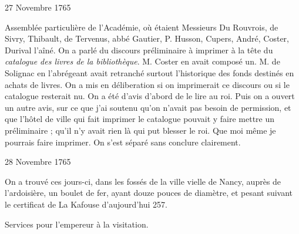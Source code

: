                      \begin{diary}{27 Novembre 1765}{}

                         Assemblée particulière de
                              l'Académie, où
                           étaient Messieurs
                           Du Rouvrois, de Sivry, Thibault,
                           de Tervenus, abbé Gautier, P.
                              Husson, Cupers,
                           André, Coster, Durival
                              l'aîné. On a parlé
                           du discours préliminaire à imprimer à la tête
                           du \emph{catalogue des livres
                                 de la bibliothèque}. M.
                              Coster en avait composé un. M. de Solignac
                           en l'abrégeant avait retranché surtout l'historique
                           des fonds destinés en achats de livres. On a
                           mis en déliberation si on imprimerait ce
                           discours ou si le catalogue resterait nu. On a
                           été d'avis d'abord de le lire au roi. Puis on a
                           ouvert un autre avis, sur ce que j'ai soutenu
                           qu'on n'avait pas besoin de permission, et que
                           l'hôtel de ville qui fait imprimer
                           le catalogue
                           pouvait y faire mettre un préliminaire ;
                           qu'il n'y avait rien là qui put blesser le roi.
                           Que moi même je pourrais faire imprimer.
                           On s'est séparé sans conclure clairement. \bigskip


                     \end{diary}

                     \begin{diary}{28 Novembre 1765}{}

                         On a trouvé ces jours-ci, dans les
                           fossés de la
                              ville vielle de Nancy, auprès de l'ardoisière, un
                           boulet de fer, ayant douze pouces de diamètre,
                           et pesant suivant le certificat de La
                              Kafouse
                           d'aujourd'hui 257. \bigskip


                         Services pour l'empereur à la visitation. \bigskip


                     \end{diary}

